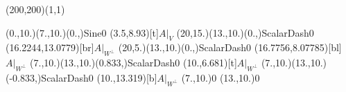 \unitlength=1bp%

\begin{feynartspicture}(200,200)(1,1)

\FADiagram{}
\FAProp(0.,10.)(7.,10.)(0.,){Sine}{0}
\FALabel(3.5,8.93)[t]{$A|_V$}
\FAProp(20,15.)(13.,10.)(0.,){ScalarDash}{0}
\FALabel(16.2244,13.0779)[br]{$A|_{W^\perp}$}
\FAProp(20,5.)(13.,10.)(0.,){ScalarDash}{0}
\FALabel(16.7756,8.07785)[bl]{$A|_{W^\perp}$}
\FAProp(7.,10.)(13.,10.)(0.833,){ScalarDash}{0}
\FALabel(10.,6.681)[t]{$A|_{W^\perp}$}
\FAProp(7.,10.)(13.,10.)(-0.833,){ScalarDash}{0}
\FALabel(10.,13.319)[b]{$A|_{W^\perp}$}
\FAVert(7.,10.){0}
\FAVert(13.,10.){0}
\end{feynartspicture}

